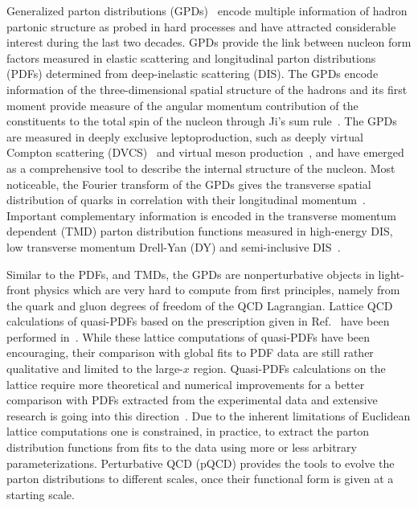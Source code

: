 \documentclass[aps,prd,preprint,groupedaddress]{revtex4-1}
\begin{document}
Generalized parton distributions (GPDs)~\cite{Mueller:1998fv, Radyushkin:1996nd, Ji:1996ek, GPDsRev} encode multiple information of hadron partonic structure as probed in hard processes and have attracted considerable interest during the last two decades.   GPDs provide the link between  nucleon form factors measured in elastic scattering and longitudinal parton distributions (PDFs) determined from deep-inelastic scattering (DIS).  The GPDs encode information of the three-dimensional spatial structure of the hadrons and its first moment provide measure of the  angular momentum contribution of the constituents to the total spin of the nucleon through Ji's sum rule~\cite{Ji:1996ek}. The GPDs are measured in deeply exclusive leptoproduction, such as deeply virtual Compton scattering (DVCS)~\cite{Pisano:2015iqa} and virtual meson production~\cite{Bedlinskiy:2014tvi}, and have emerged as a comprehensive tool to describe the internal structure of the nucleon.
{\color{blue} Most noticeable, the Fourier transform of the GPDs gives the transverse spatial distribution of quarks in correlation with their longitudinal momentum~\cite{Burkardt:2000za, Diehl:2002he}.} Important complementary information is encoded in the transverse momentum dependent (TMD) parton distribution functions  measured in high-energy DIS, low transverse momentum Drell-Yan (DY) and semi-inclusive DIS~\cite{Angeles-Martinez:2015sea}.


Similar to the PDFs, and TMDs, the GPDs  are nonperturbative  objects in light-front physics which are very hard to compute from first principles,  namely from the quark and gluon degrees of freedom of the QCD Lagrangian. {\color{blue} Lattice QCD calculations of quasi-PDFs based on the prescription given in Ref.~\cite{Ji:2013dva} have been performed in~\cite{Lin:2014zya,  Alexandrou:2015rja,  Alexandrou:2016jqi,  Lin:2017ani}.  While these lattice computations of quasi-PDFs have been encouraging, their comparison with global fits to PDF data are still rather qualitative and limited to the large-$x$ region. Quasi-PDFs calculations on the lattice require more theoretical and numerical improvements for a better comparison with PDFs extracted from the experimental data and extensive research is going into this direction~\cite{altLQCD}.}  Due to the inherent limitations of Euclidean lattice computations one is constrained, in practice, to extract the parton distribution functions from fits to the data using more or less arbitrary parameterizations. Perturbative QCD (pQCD) provides the tools to evolve the parton distributions to different scales, once their functional form is given at a starting scale.
\end{document}
